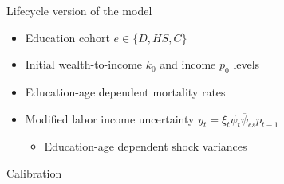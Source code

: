 \documentclass{beamer}
\begin{document}

\begin{frame}{Lifecycle version of the model}
\begin{itemize}
\item Education cohort $e \in \{D, HS, C\}$
\item Initial wealth-to-income $k_0$ and income $p_0$ levels
\item Education-age dependent mortality rates
\par \parencite{Brown2007}
\item Modified labor income uncertainty $y_t = \xi_t \psi_t \overline{\psi}_{es} p_{t-1}$
\par \parencite{Cagetti2003}
\begin{itemize}
\item Education-age dependent shock variances
\par \parencite{Sabelhaus2010}
\end{itemize}
\end{itemize}
\end{frame}

\begin{frame}{Calibration}
\vfill
\begin{table}
  \centering
  \scriptsize 
  
\end{table}
\vfill
\end{frame}

\end{document}
